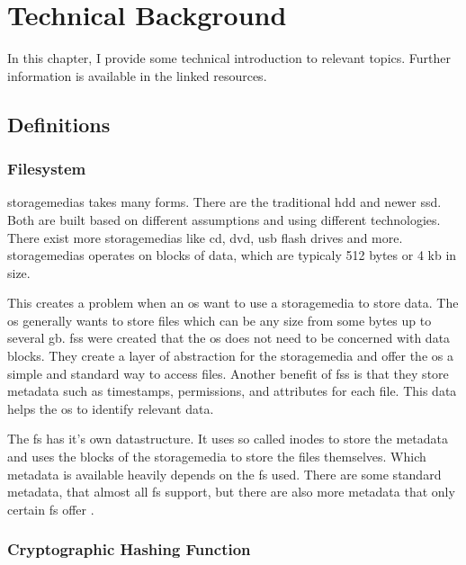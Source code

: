 \chapter{Technical Background}

In this chapter, I provide some technical introduction to relevant topics. Further information is available in the linked resources.

\section{Definitions}

\subsection{Filesystem}
\label{sec:fs}

\Glspl{storagemedia} takes many forms. There are the traditional \gls{hdd} and newer \gls{ssd}. Both are built based on different assumptions and using different technologies. There exist more \glspl{storagemedia} like \gls{cd}, \gls{dvd}, \gls{usb} flash drives and more. \Glspl{storagemedia} operates on blocks of data, which are typicaly 512 bytes or 4 \gls{kb} in size. \cite{bruce:imaging}

This creates a problem when an \gls{os} want to use a \gls{storagemedia} to store data. The \gls{os} generally wants to store files which can be any size from some bytes up to several \gls{gb}. \Glspl{fs} were created that the \gls{os} does not need to be concerned with data blocks. They create a layer of abstraction for the \gls{storagemedia} and offer the \gls{os} a simple and standard way to access files. Another benefit of \glspl{fs} is that they store \gls{metadata} such as timestamps, permissions, and attributes for each file. This data helps the \gls{os} to identify relevant data.

The \gls{fs} has it's own datastructure. It uses so called inodes to store the \gls{metadata} and uses the blocks of the \gls{storagemedia} to store the files themselves. Which \gls{metadata} is available heavily depends on the \gls{fs} used. There are some standard \gls{metadata}, that almost all \gls{fs} support, but there are also more \gls{metadata} that only certain \gls{fs} offer \cite{bruce:imaging}.

\subsection{Cryptographic Hashing Function}
\label{sec:hashing}

